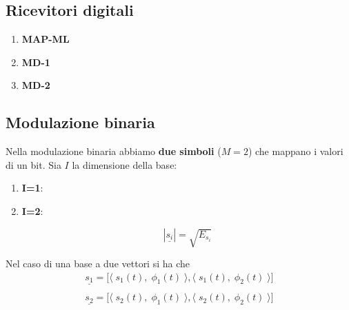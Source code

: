 \documentclass{article}
\begin{document}
\subsection{Ricevitori digitali}
\begin{enumerate}
	\item \textbf{MAP-ML}
	\begin{center}
	\end{center}
	\item \textbf{MD-1}
	\begin{center}
	\end{center}
	\item \textbf{MD-2}
	\begin{center}
	\end{center}
\end{enumerate}

\subsection{Modulazione binaria}
Nella modulazione binaria abbiamo \textbf{due simboli} ($M=2$) che mappano i valori di un bit.
Sia $I$ la dimensione della base:
\begin{enumerate}
	\item \textbf{I=1}:
	\begin{center}
	\end{center}
	\item \textbf{I=2}:
	\begin{center}
	\end{center}
	$$|\underline{s_i}|=\sqrt{E_{s_i}}$$
\end{enumerate}
Nel caso di una base a due vettori si ha che
$$\begin{array}{c}
	\underline{s_1}=\biggl[\langle\;s_1(t),\;\phi_1(t)\;\rangle,\langle\;s_1(t),\;\phi_2(t)\;\rangle\biggl]\\\\
	\underline{s_2}=\biggl[\langle\;s_2(t),\;\phi_1(t)\;\rangle,\langle\;s_2(t),\;\phi_2(t)\;\rangle\biggl]
\end{array}$$
\end{document}
